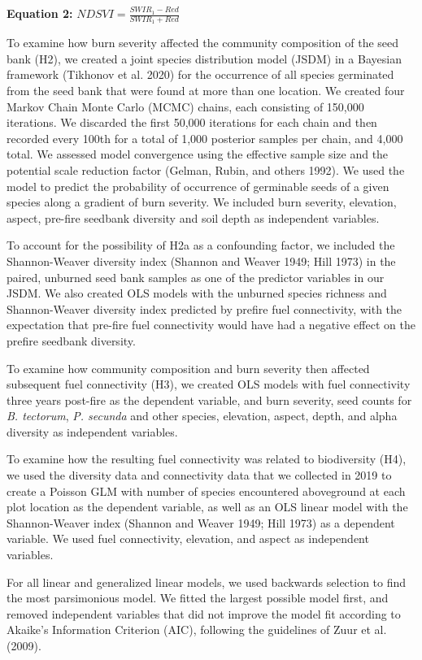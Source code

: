 \documentclass[
  12pt,
]{article}
\begin{document}
\textbf{Equation 2:} \(NDSVI = \frac{SWIR_1 - Red}{SWIR_1 + Red}\)

To examine how burn severity affected the community composition of the
seed bank (H2), we created a joint species distribution model (JSDM) in
a Bayesian framework (Tikhonov et al. 2020) for the occurrence of all
species germinated from the seed bank that were found at more than one
location. We created four Markov Chain Monte Carlo (MCMC) chains, each
consisting of 150,000 iterations. We discarded the first 50,000
iterations for each chain and then recorded every 100th for a total of
1,000 posterior samples per chain, and 4,000 total. We assessed model
convergence using the effective sample size and the potential scale
reduction factor (Gelman, Rubin, and others 1992). We used the model to
predict the probability of occurrence of germinable seeds of a given
species along a gradient of burn severity. We included burn severity,
elevation, aspect, pre-fire seedbank diversity and soil depth as
independent variables.

To account for the possibility of H2a as a confounding factor, we
included the Shannon-Weaver diversity index (Shannon and Weaver 1949;
Hill 1973) in the paired, unburned seed bank samples as one of the
predictor variables in our JSDM. We also created OLS models with the
unburned species richness and Shannon-Weaver diversity index predicted
by prefire fuel connectivity, with the expectation that pre-fire fuel
connectivity would have had a negative effect on the prefire seedbank
diversity.

To examine how community composition and burn severity then affected
subsequent fuel connectivity (H3), we created OLS models with fuel
connectivity three years post-fire as the dependent variable, and burn
severity, seed counts for \emph{B. tectorum}, \emph{P. secunda} and
other species, elevation, aspect, depth, and alpha diversity as
independent variables.

To examine how the resulting fuel connectivity was related to
biodiversity (H4), we used the diversity data and connectivity data that
we collected in 2019 to create a Poisson GLM with number of species
encountered aboveground at each plot location as the dependent variable,
as well as an OLS linear model with the Shannon-Weaver index (Shannon
and Weaver 1949; Hill 1973) as a dependent variable. We used fuel
connectivity, elevation, and aspect as independent variables.

For all linear and generalized linear models, we used backwards
selection to find the most parsimonious model. We fitted the largest
possible model first, and removed independent variables that did not
improve the model fit according to Akaike's Information Criterion (AIC),
following the guidelines of Zuur et al. (2009).
\end{document}
